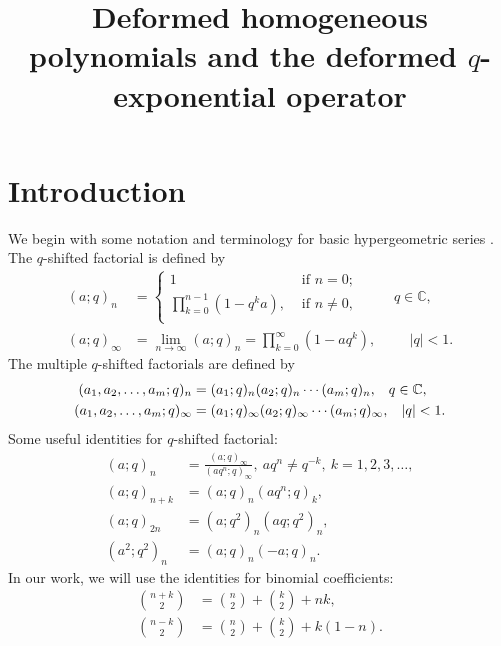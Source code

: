 \documentclass{cimart}
\title{Deformed homogeneous polynomials and the deformed $q$-exponential operator}
\newcommand{\C}{\mathbb{C}}
\begin{document}
   

\section{Introduction}

We begin with some notation and terminology for basic hypergeometric series \cite{gasper}. The $q$-shifted factorial is defined by
\begin{align*}
    (a;q)_{n}&=\begin{cases}
        1&\text{ if }n=0;\\
    \prod_{k=0}^{n-1}(1-q^{k}a),&\text{ if }n\neq0,\\
    \end{cases}\hspace{1cm}q\in\C,\\
    (a;q)_{\infty}&=\lim_{n\rightarrow\infty}(a;q)_{n}=\prod_{k=0}^{\infty}(1-aq^{k}),\hspace{1cm} \vert q\vert<1.
\end{align*}
The multiple $q$-shifted factorials are defined by
\begin{align*}
    (a_{1},a_{2},\ldots,a_{m};q)_{n}&=(a_{1};q)_{n}(a_{2};q)_{n}\cdots(a_{m};q)_{n},\hspace{0.3cm}q\in\C,\\
    (a_{1},a_{2},\ldots,a_{m};q)_{\infty}&=(a_{1};q)_{\infty}(a_{2};q)_{\infty}\cdots(a_{m};q)_{\infty},\hspace{0.3cm}\vert q\vert<1.
\end{align*}
Some useful identities for $q$-shifted factorial:
\begin{align}
    (a;q)_{n}&=\frac{(a;q)_{\infty}}{(aq^n;q)_{\infty}},\ aq^n\neq q^{-k},\ k=1,2,3,\ldots,\label{eqn_iden1}\\
    (a;q)_{n+k}&=(a;q)_{n}(aq^{n};q)_{k},\label{eqn_iden2}\\
    (a;q)_{2n}&=(a;q^2)_{n}(aq;q^2)_{n},\label{eqn_iden3}\\
    (a^2;q^2)_{n}&=(a;q)_{n}(-a;q)_{n}.\label{eqn_iden4}
\end{align}
In our work, we will use the identities for binomial coefficients:
\begin{align*}
    \binom{n+k}{2}&=\binom{n}{2}+\binom{k}{2}+nk,\\
    \binom{n-k}{2}&=\binom{n}{2}+\binom{k}{2}+k(1-n).
\end{align*}
\end{document}
